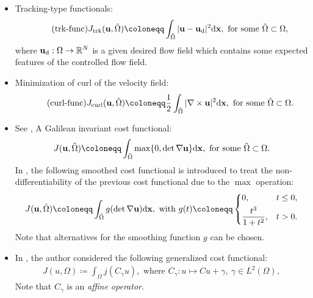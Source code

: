 \documentclass[oneside,11pt]{book}
\numberwithin{equation}{section}
\begin{document}
\begin{itemize}
    \item Tracking-type functionals:
    \begin{align}
        \label{tracking-type functional}
        \tag{trk-func}J_{\rm trk}({\bf u},\tilde{\Omega})\coloneqq\int_{\tilde{\Omega}} |{\bf u} - {\bf u}_{\rm d}|^2{\rm d}{\bf x},\mbox{ for some }\tilde{\Omega}\subset\Omega,
    \end{align}
    where ${\bf u}_{\rm d}:\Omega\to\mathbb{R}^N$ is a given desired flow field which contains some expected features of the controlled flow field.
    \item Minimization of curl of the velocity field:
    \begin{align}
        \label{curl functional}
        \tag{curl-func}
        J_{\rm curl}({\bf u},\tilde{\Omega})\coloneqq\frac{1}{2}\int_{\tilde{\Omega}} |\nabla\times{\bf u}|^2{\rm d}{\bf x},\mbox{ for some }\tilde{\Omega}\subset\Omega.
    \end{align}
    \item See \cite{Hintermueller_Kunisch_Spasov_Volkwein2004}, A Galilean invariant cost functional:
    \begin{align*}
        J({\bf u},\tilde{\Omega})\coloneqq\int_{\tilde{\Omega}} \max\{0,\det\nabla{\bf u}\}{\rm d}{\bf x},\mbox{ for some }\tilde{\Omega}\subset\Omega.
    \end{align*}
    In \cite{Kasumba2010}, the following smoothed cost functional is introduced to treat the non-differentiability of the previous cost functional due to the $\max$ operation:
    \begin{equation*}
        J({\bf u},\tilde{\Omega})\coloneqq\int_{\tilde{\Omega}} g(\det\nabla{\bf u}){\rm d}{\bf x},\mbox{ with } g(t)\coloneqq\left\{\begin{split}
            &0,&&t\le 0,\\
            &\frac{t^3}{1 + t^2},&&t > 0.
        \end{split}\right.
    \end{equation*}
    Note that alternatives for the smoothing function $g$ can be chosen.
    \item In \cite{Kasumba2010}, the author considered the following generalized cost functional:
    \begin{align*}
        J(u,\Omega)\coloneqq\int_\Omega j(C_\gamma u),\mbox{ where } C_\gamma:u\mapsto Cu + \gamma,\ \gamma\in L^2(\Omega),
    \end{align*}
    Note that $C_\gamma$ is an \textit{affine operator}.

\end{itemize}
\end{document}
